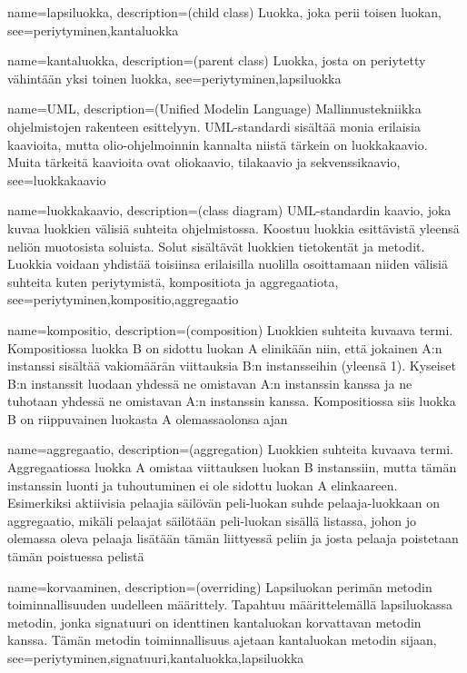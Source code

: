 {
	name=lapsiluokka,
	description={(child class) Luokka, joka perii toisen luokan},
	see={periytyminen,kantaluokka}
}

{
	name=kantaluokka,
	description={(parent class) Luokka, josta on periytetty vähintään yksi toinen luokka},
	see={periytyminen,lapsiluokka}
}

{
	name=UML,
	description={(Unified Modelin Language) Mallinnustekniikka ohjelmistojen rakenteen esittelyyn.
UML-standardi sisältää monia erilaisia kaavioita, mutta olio-ohjelmoinnin kannalta niistä tärkein
on luokkakaavio. Muita tärkeitä kaavioita ovat oliokaavio, tilakaavio ja sekvenssikaavio},
	see=luokkakaavio
}

{	
	name=luokkakaavio,
	description={(class diagram) UML-standardin kaavio, joka kuvaa luokkien välisiä suhteita
ohjelmistossa. Koostuu luokkia esittävistä yleensä neliön muotosista soluista. Solut sisältävät
luokkien tietokentät ja metodit. Luokkia voidaan yhdistää toisiinsa erilaisilla nuolilla
osoittamaan niiden välisiä suhteita kuten periytymistä, kompositiota ja aggregaatiota},
	see={periytyminen,kompositio,aggregaatio}
}

{
	name=kompositio,
	description={(composition) Luokkien suhteita kuvaava termi. Kompositiossa luokka B on sidottu
luokan A elinikään niin, että jokainen A:n instanssi sisältää vakiomäärän viittauksia B:n
instansseihin (yleensä 1). Kyseiset B:n instanssit luodaan yhdessä ne omistavan A:n instanssin
kanssa ja ne tuhotaan yhdessä ne omistavan A:n instanssin kanssa. Kompositiossa siis luokka B on
riippuvainen luokasta A olemassaolonsa ajan}
}

{
	name=aggregaatio,
	description={(aggregation) Luokkien suhteita kuvaava termi. Aggregaatiossa luokka A omistaa
viittauksen luokan B instanssiin, mutta tämän instanssin luonti ja tuhoutuminen ei ole sidottu
luokan A elinkaareen. Esimerkiksi aktiivisia pelaajia säilövän peli-luokan suhde pelaaja-luokkaan
on aggregaatio, mikäli pelaajat säilötään peli-luokan sisällä listassa, johon jo olemassa oleva
pelaaja lisätään tämän liittyessä peliin ja josta pelaaja poistetaan tämän poistuessa pelistä}
}

{
	name=korvaaminen,
	description={(overriding) Lapsiluokan perimän metodin toiminnallisuuden uudelleen määrittely.
Tapahtuu määrittelemällä lapsiluokassa metodin, jonka signatuuri on identtinen kantaluokan
korvattavan metodin kanssa. Tämän metodin toiminnallisuus ajetaan kantaluokan metodin sijaan},
	see={periytyminen,signatuuri,kantaluokka,lapsiluokka}
}

